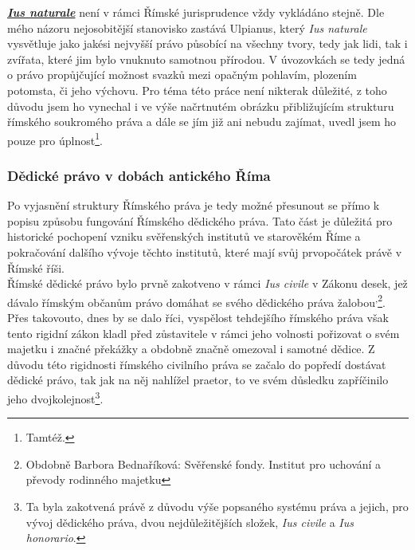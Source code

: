 \documentclass{article}
\begin{document}
\underline{\textbf{\textit{Ius naturale}}} není v rámci Římské jurisprudence vždy vykládáno stejně. Dle mého názoru nejosobitější stanovisko zastává Ulpianus, který \textit{Ius naturale} vysvětluje jako jakési nejvyšší právo působící na všechny tvory, tedy jak lidi, tak i zvířata, které jim bylo vnuknuto samotnou přírodou. V úvozovkách se tedy jedná o právo propůjčující možnost svazků mezi opačným pohlavím, plozením potomsta, či jeho výchovu. Pro téma této práce není nikterak důležité, z toho důvodu jsem ho vynechal i ve výše načrtnutém obrázku přibližujícím strukturu římského soukromého práva a dále se jím již ani nebudu zajímat, uvedl jsem ho pouze pro úplnost\footnote{Tamtéž.}.\\


\subsubsection{Dědické právo v dobách antického Říma}

Po vyjasnění struktury Římského práva je tedy možné přesunout se přímo k popisu způsobu fungování Římského dědického práva. Tato část je důležitá pro historické pochopení vzniku svěřenských institutů ve starověkém Říme a pokračování dalšího vývoje těchto institutů, které mají svůj prvopočátek právě v Římské říši. \\


Římské dědické právo bylo prvně zakotveno v rámci \textit{Ius civile} v Zákonu \MakeUppercase{} desek, jež dávalo římským občanům právo domáhat se svého dědického práva žalobou\textsuperscript{,}\footnote{Obdobně Barbora Bednaříková: Svěřenské fondy. Institut pro uchování a převody rodinného majetku}. Přes takovouto, dnes by se dalo říci, vyspělost tehdejšího římského práva však tento rigidní zákon kladl před zůstavitele v rámci jeho volnosti pořizovat o svém majetku i značné překážky a obdobně značně omezoval i samotné dědice. Z důvodu této rigidnosti římského civilního práva se začalo do popředí dostávat dědické právo, tak jak na něj nahlížel praetor, to ve svém důsledku zapříčinilo jeho dvojkolejnost\footnote{Ta byla zakotvená právě z důvodu výše popsaného systému práva a jejich, pro vývoj dědického práva, dvou nejdůležitějších složek, \textit{Ius civile} a \textit{Ius honorario}.}.\\
\end{document}

